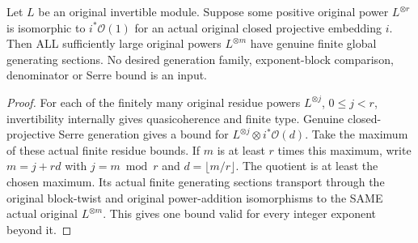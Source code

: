 \begin{theorem}
\label{thm:positive-power-projective-eventual-generation}
\leanok
{}
Let $L$ be an original invertible module. Suppose some positive
original power $L^{\otimes r}$ is isomorphic to $i^*\mathcal O(1)$
for an actual original closed projective embedding $i$.
Then ALL sufficiently large original powers $L^{\otimes m}$
have genuine finite global generating sections. No desired
generation family, exponent-block comparison, denominator or
Serre bound is an input.
\end{theorem}
\begin{proof}
For each of the finitely many original residue powers
$L^{\otimes j}$, $0\leq j<r$, invertibility internally gives
quasicoherence and finite type. Genuine closed-projective Serre
generation gives a bound for
$L^{\otimes j}\otimes i^*\mathcal O(d)$. Take the maximum of
these actual finite residue bounds. If $m$ is at least $r$
times this maximum, write $m=j+rd$ with $j=m\bmod r$ and
$d=\lfloor m/r\rfloor$. The quotient is at least the chosen
maximum. Its actual finite generating sections transport
through the original block-twist and original power-addition
isomorphisms to the SAME actual original $L^{\otimes m}$.
This gives one bound valid for every integer exponent beyond it.
\end{proof}
